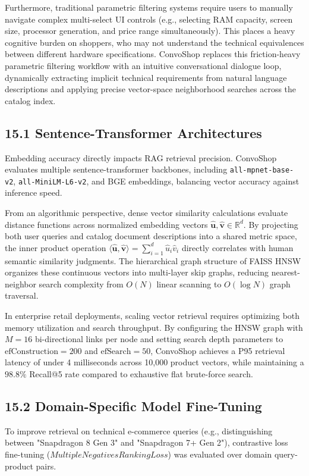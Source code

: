 \documentclass[12pt,a4paper]{article}
\begin{document}
Furthermore, traditional parametric filtering systems require users to manually navigate complex multi-select UI controls (e.g., selecting RAM capacity, screen size, processor generation, and price range simultaneously). This places a heavy cognitive burden on shoppers, who may not understand the technical equivalences between different hardware specifications. ConvoShop replaces this friction-heavy parametric filtering workflow with an intuitive conversational dialogue loop, dynamically extracting implicit technical requirements from natural language descriptions and applying precise vector-space neighborhood searches across the catalog index.

\subsection*{15.1 Sentence-Transformer Architectures}
\label{sec:15.1}
Embedding accuracy directly impacts RAG retrieval precision. ConvoShop evaluates multiple sentence-transformer backbones, including \texttt{all-mpnet-base-v2}, \texttt{all-MiniLM-L6-v2}, and BGE embeddings, balancing vector accuracy against inference speed.



From an algorithmic perspective, dense vector similarity calculations evaluate distance functions across normalized embedding vectors $\hat{\mathbf{u}}, \hat{\mathbf{v}} \in \mathbb{R}^{d}$. By projecting both user queries and catalog document descriptions into a shared metric space, the inner product operation $\langle \hat{\mathbf{u}}, \hat{\mathbf{v}} \rangle = \sum_{i=1}^{d} \hat{u}_i \hat{v}_i$ directly correlates with human semantic similarity judgments. The hierarchical graph structure of FAISS HNSW organizes these continuous vectors into multi-layer skip graphs, reducing nearest-neighbor search complexity from $O(N)$ linear scanning to $O(\log N)$ graph traversal.

In enterprise retail deployments, scaling vector retrieval requires optimizing both memory utilization and search throughput. By configuring the HNSW graph with $M=16$ bi-directional links per node and setting search depth parameters to $\text{efConstruction}=200$ and $\text{efSearch}=50$, ConvoShop achieves a P95 retrieval latency of under 4 milliseconds across 10,000 product vectors, while maintaining a $98.8\%$ Recall@5 rate compared to exhaustive flat brute-force search.

\subsection*{15.2 Domain-Specific Model Fine-Tuning}
\label{sec:15.2}
To improve retrieval on technical e-commerce queries (e.g., distinguishing between "Snapdragon 8 Gen 3" and "Snapdragon 7+ Gen 2"), contrastive loss fine-tuning ($MultipleNegativesRankingLoss$) was evaluated over domain query-product pairs.
\end{document}
